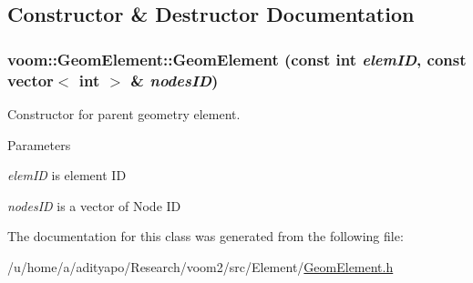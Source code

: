 \subsection{Constructor \& Destructor Documentation}
\hypertarget{classvoom_1_1_geom_element_a81373f05c7c57bf7f525766d6b6f679b}{
\subsubsection[{GeomElement}]{\setlength{\rightskip}{0pt plus 5cm}voom::GeomElement::GeomElement (const int {\em elemID}, \/  const vector$<$ int $>$ \& {\em nodesID})}}
\label{classvoom_1_1_geom_element_a81373f05c7c57bf7f525766d6b6f679b}
Constructor for parent geometry element. 
\begin{DoxyParams}{Parameters}
\item[{\em elemID}]is element ID \item[{\em nodesID}]is a vector of Node ID \end{DoxyParams}


The documentation for this class was generated from the following file:\begin{DoxyCompactItemize}
\item 
/u/home/a/adityapo/Research/voom2/src/Element/\hyperlink{_geom_element_8h}{GeomElement.h}\end{DoxyCompactItemize}
